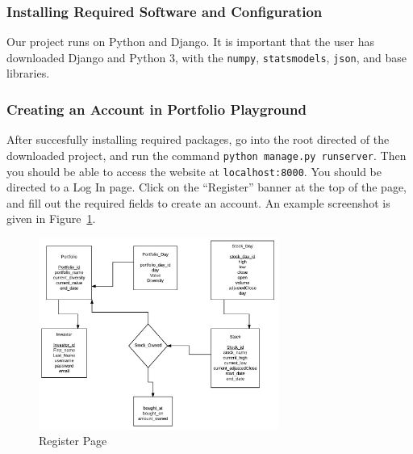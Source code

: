 \documentclass{article}
\begin{document}
\subsubsection{Installing Required Software and Configuration}
Our project runs on Python and Django. It is important that the user has downloaded Django and Python 3, with the \texttt{numpy}, \texttt{statsmodels}, \texttt{json}, and base libraries.

\subsubsection{Creating an Account in Portfolio Playground}
After succesfully installing required packages, go into the root directed of the downloaded project, and run the command \texttt{python manage.py runserver}. Then you should be able to access the website at \texttt{localhost:8000}. You should be directed to a Log In page.  Click on the ``Register'' banner at the top of the page, and fill out the required fields to create an account. An example screenshot is given in Figure~\ref{fig:register}.

\begin{figure}[H]
\begin{center}
\includegraphics[width=0.7\textwidth]{db_diagram}
\caption{\label{fig:register} Register Page}
\end{center}
\end{figure}
\end{document}
